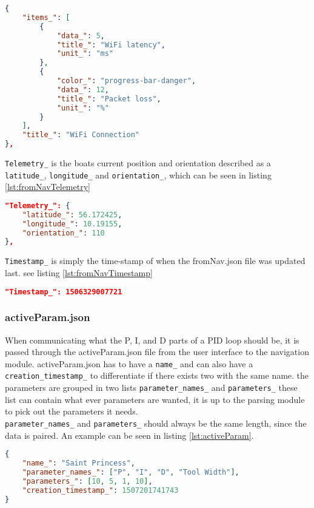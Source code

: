 \begin{lstlisting}[caption = {Example of an object in Status_ in fromNav.JSON}, captionpos=b, label={lst:fromNavStatusItem}, language=json,firstnumber=1]
{
    "items_": [
        {
            "data_": 5,
            "title_": "WiFi latency",
            "unit_": "ms"
        },
        {
            "color_": "progress-bar-danger",
            "data_": 12,
            "title_": "Packet loss",
            "unit_": "%"
        }
    ],
    "title_": "WiFi Connection"
},
\end{lstlisting}

\texttt{Telemetry_} is the boats current position and orientation described as a \texttt{latitude_}, \texttt{longitude_} and \texttt{orientation_}, which can be seen in listing \ref{lst:fromNavTelemetry}

\begin{lstlisting}[caption = {Example of an Telemetry_ object in fromNav.json}, captionpos=b, label={lst:fromNavTelemetry}, language=json,firstnumber=1]
"Telemetry_": {
    "latitude_": 56.172425,
    "longitude_": 10.19155,
    "orientation_": 110
},
\end{lstlisting}

\texttt{Timestamp_} is simply the time-stamp of when the fromNav.json file was updated last. see listing \ref{lst:fromNavTimestamp} 

\begin{lstlisting}[caption = {Example of an Timestamp_ object in fromNav.json}, captionpos=b, label={lst:fromNavTimestamp}, language=json,firstnumber=1]
"Timestamp_": 1506329007721
\end{lstlisting}


\subsubsection{activeParam.json}
\label{sec:active_param}
When communicating what the P, I, and D parts of a PID loop should be, it is passed through the activeParam.json file from the user interface to the navigation module. activeParam.json has to have a \texttt{name_} and can also have a \texttt{creation_timestamp_} to differentiate if there exists two with the same name. the parameters are grouped in two lists \texttt{parameter_names_} and \texttt{parameters_} these list can contain what ever parameters are wanted, it is up to the parsing module to pick out the parameters it needs.\\
\texttt{parameter_names_} and \texttt{parameters_} should always be the same length, since the data is paired.
An example can be seen in listing \ref{lst:activeParam}.
\begin{lstlisting}[caption = {Example of activeParam.json}, captionpos=b, label={lst:activeParam}, language=json,firstnumber=1]
{
	"name_": "Saint Princess",
	"parameter_names_": ["P", "I", "D", "Tool Width"],
	"parameters_": [10, 5, 1, 10],
	"creation_timestamp_": 1507201741743
}
\end{lstlisting}



